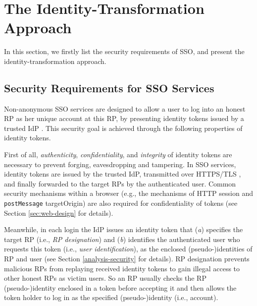 \section{The Identity-Transformation Approach}
\label{sec:challenge}

In this section,
    we firstly list the security requirements of SSO,
        and present the identity-transformation approach.

\subsection{Security Requirements for SSO Services}
\label{subsec:basicrequirements}

Non-anonymous SSO services are designed to allow a user to log into an honest RP as her unique account at this RP, %
by presenting identity tokens issued by a trusted IdP   \cite{OpenIDConnect,rfc6749,SAML,SAMLIdentifier,NIST2017draft}.
This security goal is achieved through the following properties of identity tokens.

First of all, \emph{authenticity}, \emph{confidentiality}, and \emph{integrity} of identity tokens are necessary to prevent forging, eavesdropping and tampering.
In SSO services, identity tokens are issued by the trusted IdP,
    transmitted over HTTPS/TLS \cite{OpenIDConnect, rfc6749, SAML},
    and finally forwarded to the target RPs by the authenticated user.
Common security mechanisms within a browser (e.g., the mechanisms of HTTP session and \verb+postMessage+ targetOrigin)
are also required for confidentiality of tokens \cite{GoogleIdIntegrate,de2014oauth,FettKS14,BrowserID} (see Section \ref{sec:web-design} for details).

Meanwhile, in each login the IdP issues an identity token that (\emph{a}) specifies the target RP (i.e., \emph{RP designation}) and (\emph{b}) identifies the authenticated user who requests this token (i.e., \emph{user identification}),
        as the enclosed (pseudo-)identities of RP and user \cite{OpenIDConnect,rfc6749,SAML} (see Section \ref{analysis-security} for details).
RP designation prevents malicious RPs from replaying received identity tokens to gain illegal access to other honest RPs as victim users.
So an RP usually checks the RP (pseudo-)identity enclosed in a token before accepting it 
\cite{OpenIDConnect,BrowserID,SPRESSO,NIST2017draft,POIDC,save-flow,up-sso,miso}
 and then allows the token holder to log in as the specified (pseudo-)identity (i.e., account).

